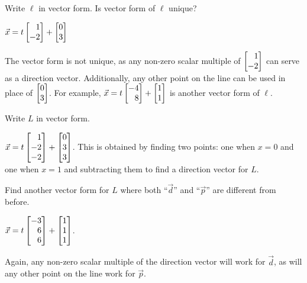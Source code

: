 \documentclass{problemset}
\begin{document}
	\begin{parts}
		\item Write $\ell$ in vector form. Is vector form of $\ell$ unique?
			\begin{solution}
				$\vec x = t \mat{1 \\ -2} + \mat{0 \\ 3}$

				The vector form is not unique, as any non-zero scalar multiple of
				$\mat{1 \\ -2}$ can serve as a direction vector. Additionally,
				any other point on the line can be used in place of
				$\mat{0 \\3}$. For example,  $\vec x = t \mat{-4 \\ 8} + \mat{1 \\ 1}$
				is another vector form of $\ell$.
			\end{solution}
		\item Write $L$ in vector form.
			\begin{solution}[inline]
				$\vec x = t\mat{1 \\ -2 \\ -2} + \mat{0 \\ 3 \\ 3}$. This is obtained
				by finding two points: one when $x=0$ and one when $x=1$ and subtracting
				them to find a direction vector for $L$.
			\end{solution}
		\item Find another vector form for $L$ where both ``$\vec d$'' and
			``$\vec p$'' are different from before.
			\begin{solution}
				$\vec x = t \mat{-3 \\ 6 \\ 6} + \mat{1 \\ 1 \\ 1}$.

				Again, any non-zero scalar multiple of the direction vector
				will work for $\vec d$, as will any other point on the line
				work for $\vec p$.
			\end{solution}
	\end{parts}
\end{document}
